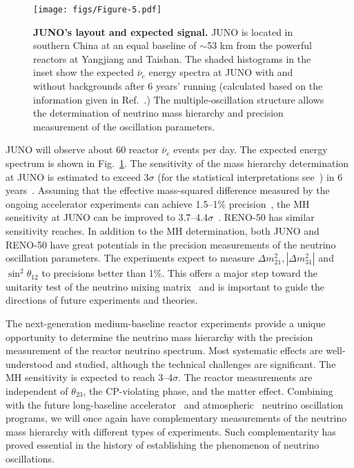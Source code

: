 \documentclass[aps,twocolumn,preprintnumbers,amsmath,superscriptaddress,amssymb,floats,nofootinbib]{revtex4-1}
\begin{document}
\begin{figure}[tb] 
  \centering
  \texttt{[image: figs/Figure-5.pdf]}
  \caption{{\bf JUNO's layout and expected signal.} JUNO is located in southern China at an equal baseline of $\sim$53 km from the powerful reactors at Yangjiang and Taishan. The shaded histograms in the inset show the expected $\bar\nu_e$ energy spectra at JUNO with and without backgrounds after 6 years' running (calculated based on the information given in Ref.~\cite{He-Now2014}.) The multiple-oscillation structure allows the determination of neutrino mass hierarchy and precision measurement of the oscillation parameters.}
  \label{fig:juno}
\end{figure}

JUNO will observe about 60 reactor $\bar\nu_e$ events per day. The expected energy spectrum is shown in Fig.~\ref{fig:juno}.
The sensitivity of the mass hierarchy determination at JUNO is estimated to exceed 3$\sigma$ (for the statistical interpretations see~\cite{Qian-Stat,Blennow}) in 6 years~\cite{Li-PRD13,MBRwitepaper}. 
Assuming that the effective mass-squared difference measured by the ongoing accelerator experiments can achieve 1.5--1\% precision~\cite{Agarwalla}, the MH sensitivity at JUNO can be improved to 3.7--4.4$\sigma$~\cite{Li-PRD13}. 
RENO-50 has similar sensitivity reaches.
In addition to the MH determination, both JUNO and RENO-50 have great potentials in the precision measurements of the neutrino oscillation parameters. The experiments expect to measure $\Delta m^2_{21}, |\Delta m^2_{31}|$ and $\sin^2 \theta_{12}$ to precisions better than 1\%. This offers a major step toward the unitarity test of the neutrino mixing matrix~\cite{unitarity13} and is important to guide the directions of future experiments and theories. 


The next-generation medium-baseline reactor experiments provide a unique opportunity to determine the neutrino mass hierarchy with the precision measurement of the reactor neutrino spectrum.
Most systematic effects are well-understood and studied, although the technical challenges are significant. 
The MH sensitivity is expected to reach 3--4$\sigma$.
The reactor measurements are independent of $\theta_{23}$, the CP-violating phase, and the matter effect.
Combining with the future long-baseline accelerator~\cite{LBNE,LBNO} and atmospheric~\cite{PINGU,ORCA} neutrino oscillation programs, we will once again have complementary measurements of the neutrino mass hierarchy with different types of experiments. 
Such complementarity has proved essential in the history of establishing the phenomenon of neutrino oscillations.
\end{document}

